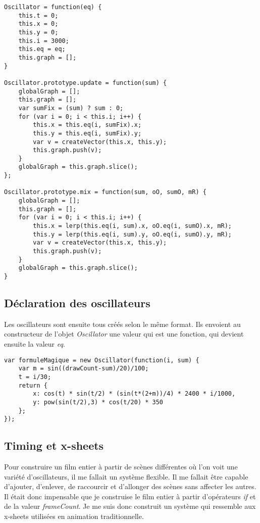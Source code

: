 \begin{lstlisting}
Oscillator = function(eq) {
    this.t = 0;
    this.x = 0;
    this.y = 0;
    this.i = 3000;
    this.eq = eq;
    this.graph = [];
}

Oscillator.prototype.update = function(sum) {
    globalGraph = [];
    this.graph = [];
    var sumFix = (sum) ? sum : 0;
    for (var i = 0; i < this.i; i++) {  
        this.x = this.eq(i, sumFix).x;
        this.y = this.eq(i, sumFix).y;
        var v = createVector(this.x, this.y);
        this.graph.push(v);
    }
    globalGraph = this.graph.slice();
};

Oscillator.prototype.mix = function(sum, oO, sumO, mR) {
    globalGraph = [];
    this.graph = [];
    for (var i = 0; i < this.i; i++) {  
        this.x = lerp(this.eq(i, sum).x, oO.eq(i, sumO).x, mR);
        this.y = lerp(this.eq(i, sum).y, oO.eq(i, sumO).y, mR);
        var v = createVector(this.x, this.y);
        this.graph.push(v);
    }
    globalGraph = this.graph.slice();
}
\end{lstlisting}
\subsection{Déclaration des oscillateurs}
Les oscillateurs sont ensuite tous créés selon le même format. Ils envoient au constructeur de l'objet \textit{Oscillator} une valeur qui est une fonction, qui devient ensuite la valeur \textit{eq}.
\begin{lstlisting}
var formuleMagique = new Oscillator(function(i, sum) {
    var m = sin((drawCount-sum)/20)/100;
    t = i/30;
    return {
        x: cos(t) * sin(t/2) * (sin(t*(2+m))/4) * 2400 * i/1000,
        y: pow(sin(t/2),3) * cos(t/20) * 350
    };
});
\end{lstlisting}
\subsection{Timing et x-sheets}
Pour construire un film entier à partir de scènes différentes où l'on voit une variété d'oscillateurs, il me fallait un système flexible. Il me fallait être capable d'ajouter, d'enlever, de raccourcir et d'allonger des scènes sans affecter les autres. Il était donc impensable que je construise le film entier à partir d'opérateurs \textit{if} et de la valeur \textit{frameCount}. Je me suis donc construit un système qui ressemble aux x-sheets utilisées en animation traditionnelle.

